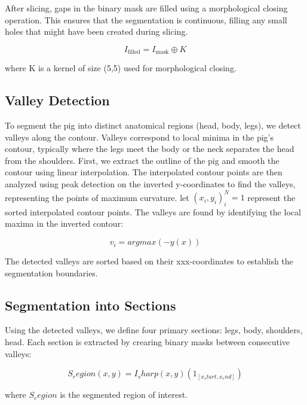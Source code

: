 {After slicing, gaps in the binary mask are filled using a morphological closing operation. This ensures that the segmentation is continuous, filling any small holes that might have been created during slicing.

\begin{equation}
	I_{\text{filled}} = I_{\text{mask}} \oplus K
\end{equation}

where K is a kernel of size (5,5) used for morphological closing.

\subsection{Valley Detection}
To segment the pig into distinct anatomical regions (head, body, legs), we detect valleys along the contour. Valleys correspond to local minima in the pig’s contour, typically where the legs meet the body or the neck separates the head from the shoulders.
First, we extract the outline of the pig and smooth the contour using linear interpolation. The interpolated contour points are then analyzed using peak detection on the inverted y-coordinates to find the valleys, representing the points of maximum curvature.
let ${(x_i, y_i)}^N _i=1$ represent the sorted interpolated contour points. The valleys are found by identifying the local maxima in the inverted contour:

\begin{equation}
	v_i=arg max(-y(x))
\end{equation}

The detected valleys are sorted based on their xxx-coordinates to establish the segmentation boundaries.

\subsection{Segmentation into Sections}
Using the detected valleys, we define four primary sections: legs, body, shoulders, head. Each section is extracted by crearing binary masks between consecutive valleys:

\begin{equation}
	S_region (x,y) = I_sharp (x,y) (1_[x_start,x_end])
\end{equation}

where $S_region$ is the segmented region of interest.

}
